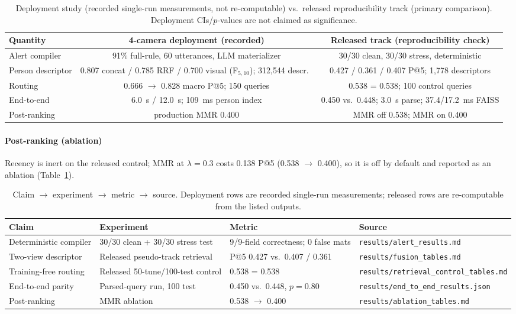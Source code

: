﻿\documentclass[conference]{IEEEtran}
\theoremstyle{plain}
\begin{document}
\begin{table}[!t]
\caption{Deployment study (recorded single-run measurements, not re-computable) vs.\ released reproducibility track (primary comparison). Deployment CIs/$p$-values are not claimed as significance.}
\label{tab:deployment_study}
\centering
\footnotesize
\setlength{\tabcolsep}{4pt}
\begin{tabular}{@{}lcc@{}}
\toprule
Quantity & 4-camera deployment (recorded) & Released track (reproducibility check) \\
\midrule
Alert compiler & 91\% full-rule, 60 utterances, LLM materializer & 30/30 clean, 30/30 stress, deterministic \\
Person descriptor & 0.807 concat / 0.785 RRF / 0.700 visual (F$_{5,10}$); 312{,}544 descr.\ & 0.427 / 0.361 / 0.407 P@5; 1{,}778 descriptors \\
Routing & 0.666 $\to$ 0.828 macro P@5; 150 queries & 0.538 = 0.538; 100 control queries \\
End-to-end & 6.0~s / 12.0~s; 109~ms person index & 0.450 vs.\ 0.448; 3.0~s parse; 37.4/17.2~ms FAISS \\
Post-ranking & production MMR 0.400 & MMR off 0.538; MMR on 0.400 \\
\bottomrule
\end{tabular}
\end{table}

\paragraph*{Post-ranking (ablation)}
Recency is inert on the released control; MMR at $\lambda{=}0.3$ costs 0.138 P@5 (0.538 $\to$ 0.400), so it is off by default and reported as an ablation (Table~\ref{tab:deployment_study}).

\begin{table}[!t]
\caption{Claim $\to$ experiment $\to$ metric $\to$ source. Deployment rows are recorded single-run measurements; released rows are re-computable from the listed outputs.}
\label{tab:claim_map}
\centering
\footnotesize
\setlength{\tabcolsep}{4pt}
\begin{tabular}{@{}llll@{}}
\toprule
Claim & Experiment & Metric & Source \\
\midrule
Deterministic compiler & 30/30 clean + 30/30 stress test & 9/9-field correctness; 0 false mats & \texttt{results/alert\_results.md} \\
Two-view descriptor & Released pseudo-track retrieval & P@5 0.427 vs.\ 0.407 / 0.361 & \texttt{results/fusion\_tables.md} \\
Training-free routing & Released 50-tune/100-test control & 0.538 = 0.538 & \texttt{results/retrieval\_control\_tables.md} \\
End-to-end parity & Parsed-query run, 100 test & 0.450 vs.\ 0.448, $p{=}0.80$ & \texttt{results/end\_to\_end\_results.json} \\
Post-ranking & MMR ablation & 0.538 $\to$ 0.400 & \texttt{results/ablation\_tables.md} \\
\bottomrule
\end{tabular}
\end{table}
\end{document}

